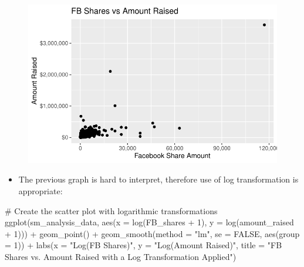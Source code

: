 \documentclass[
  letterpaper,
  DIV=11,
  numbers=noendperiod]{scrartcl}
\newenvironment{Shaded}{\begin{snugshade}}{\end{snugshade}}
\newcommand{\AttributeTok}[1]{\textcolor[rgb]{0.40,0.45,0.13}{#1}}
\newcommand{\CommentTok}[1]{\textcolor[rgb]{0.37,0.37,0.37}{#1}}
\newcommand{\ConstantTok}[1]{\textcolor[rgb]{0.56,0.35,0.01}{#1}}
\newcommand{\DecValTok}[1]{\textcolor[rgb]{0.68,0.00,0.00}{#1}}
\newcommand{\FunctionTok}[1]{\textcolor[rgb]{0.28,0.35,0.67}{#1}}
\newcommand{\NormalTok}[1]{\textcolor[rgb]{0.00,0.23,0.31}{#1}}
\newcommand{\SpecialCharTok}[1]{\textcolor[rgb]{0.37,0.37,0.37}{#1}}
\newcommand{\StringTok}[1]{\textcolor[rgb]{0.13,0.47,0.30}{#1}}
\providecommand{\tightlist}{%
  \setlength{\itemsep}{0pt}\setlength{\parskip}{0pt}}\usepackage{longtable,booktabs,array}
\begin{document}
\begin{figure}[H]

{\centering \includegraphics{gfm_data_analysis_files/figure-pdf/social-media-analysis-2-1.pdf}

}

\end{figure}

\begin{itemize}
\tightlist
\item
  The previous graph is hard to interpret, therefore use of log
  transformation is appropriate:
\end{itemize}

\begin{Shaded}
\begin{Highlighting}[]
\CommentTok{\# Create the scatter plot with logarithmic transformations}
\FunctionTok{ggplot}\NormalTok{(sm\_analysis\_data, }\FunctionTok{aes}\NormalTok{(}\AttributeTok{x =} \FunctionTok{log}\NormalTok{(FB\_shares }\SpecialCharTok{+} \DecValTok{1}\NormalTok{), }\AttributeTok{y =} \FunctionTok{log}\NormalTok{(amount\_raised }\SpecialCharTok{+} \DecValTok{1}\NormalTok{))) }\SpecialCharTok{+}
  \FunctionTok{geom\_point}\NormalTok{() }\SpecialCharTok{+}
  \FunctionTok{geom\_smooth}\NormalTok{(}\AttributeTok{method =} \StringTok{"lm"}\NormalTok{, }\AttributeTok{se =} \ConstantTok{FALSE}\NormalTok{, }\FunctionTok{aes}\NormalTok{(}\AttributeTok{group =} \DecValTok{1}\NormalTok{)) }\SpecialCharTok{+}
  \FunctionTok{labs}\NormalTok{(}\AttributeTok{x =} \StringTok{"Log(FB Shares)"}\NormalTok{, }\AttributeTok{y =} \StringTok{"Log(Amount Raised)"}\NormalTok{, }\AttributeTok{title =} \StringTok{"FB Shares vs. Amount Raised with a Log Transformation Applied"}\NormalTok{)}
\end{Highlighting}
\end{Shaded}
\end{document}
